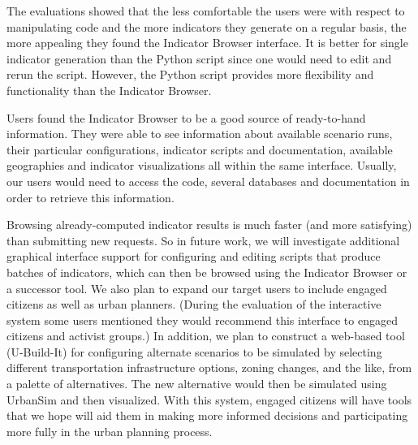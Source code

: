 The evaluations showed that the less comfortable the users were with
respect to manipulating code and the more indicators they generate on a
regular basis, the more appealing they found the Indicator Browser
interface. It is better for single indicator generation than the Python
script since one would need to edit and rerun the script. However, the
Python script provides more flexibility and functionality than the Indicator
Browser.

Users found the Indicator Browser to be a good source of ready-to-hand
information. They were able to see information about available scenario
runs, their particular configurations, indicator scripts and documentation,
available geographies and indicator visualizations all within the same
interface. Usually, our users would need to access the code, several
databases and documentation in order to retrieve this information.

Browsing already-computed indicator results is much faster (and more
satisfying) than submitting new requests.  So in future work, we will
investigate additional graphical interface support for configuring and
editing scripts that produce batches of indicators, which can then be
browsed using the Indicator Browser or a successor tool.  We also plan to
expand our target users to include engaged citizens as well as urban
planners.  
(During the evaluation of the interactive system some users mentioned they
would recommend this interface to engaged citizens and activist groups.)
In addition, we plan to construct a web-based tool (U-Build-It)
for configuring alternate scenarios to be simulated by selecting different
transportation infrastructure options, zoning changes, and the like, from a
palette of alternatives.  The new alternative would then be simulated using
UrbanSim and then visualized.  
With this system, engaged citizens will have
tools that we hope will aid them in making more informed decisions and
participating more fully in the urban planning process.


